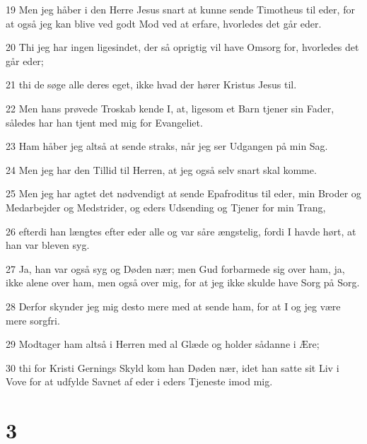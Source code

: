 \par 19 Men jeg håber i den Herre Jesus snart at kunne sende Timotheus til eder, for at også jeg kan blive ved godt Mod ved at erfare, hvorledes det går eder.
\par 20 Thi jeg har ingen ligesindet, der så oprigtig vil have Omsorg for, hvorledes det går eder;
\par 21 thi de søge alle deres eget, ikke hvad der hører Kristus Jesus til.
\par 22 Men hans prøvede Troskab kende I, at, ligesom et Barn tjener sin Fader, således har han tjent med mig for Evangeliet.
\par 23 Ham håber jeg altså at sende straks, når jeg ser Udgangen på min Sag.
\par 24 Men jeg har den Tillid til Herren, at jeg også selv snart skal komme.
\par 25 Men jeg har agtet det nødvendigt at sende Epafroditus til eder, min Broder og Medarbejder og Medstrider, og eders Udsending og Tjener for min Trang,
\par 26 efterdi han længtes efter eder alle og var såre ængstelig, fordi I havde hørt, at han var bleven syg.
\par 27 Ja, han var også syg og Døden nær; men Gud forbarmede sig over ham, ja, ikke alene over ham, men også over mig, for at jeg ikke skulde have Sorg på Sorg.
\par 28 Derfor skynder jeg mig desto mere med at sende ham, for at I og jeg være mere sorgfri.
\par 29 Modtager ham altså i Herren med al Glæde og holder sådanne i Ære;
\par 30 thi for Kristi Gernings Skyld kom han Døden nær, idet han satte sit Liv i Vove for at udfylde Savnet af eder i eders Tjeneste imod mig.

\chapter{3}

